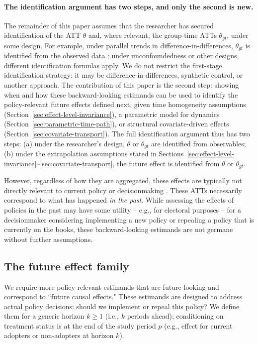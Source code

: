\documentclass{article}
\begin{document}
\paragraph{The identification argument has two steps, and only the second is new.} The remainder of this paper assumes that the researcher has secured identification of the ATT $\theta$ and, where relevant, the group-time ATTs $\theta_{gt}$, under some design. For example, under parallel trends in difference-in-differences, $\theta_{gt}$ is identified from the observed data \citep{callawayDifferenceindifferencesMultipleTime2021,sunEstimatingDynamicTreatment2021}; under unconfoundedness or other designs, different identification formulas apply. We do not restrict the first-stage identification strategy: it may be difference-in-differences, synthetic control, or another approach. The contribution of this paper is the second step: showing when and how these backward-looking estimands can be used to identify the policy-relevant future effects defined next, given time homogeneity assumptions (Section~\ref{sec:effect-level-invariance}), a parametric model for dynamics (Section~\ref{sec:parametric-time-path}), or structural covariate-driven effects (Section~\ref{sec:covariate-transport}). The full identification argument thus has two steps: (a) under the researcher's design, $\theta$ or $\theta_{gt}$ are identified from observables; (b) under the extrapolation assumptions stated in Sections~\ref{sec:effect-level-invariance}--\ref{sec:covariate-transport}, the future effect is identified from $\theta$ or $\theta_{gt}$.

However, regardless of how they are aggregated, these effects are typically not directly relevant to current policy or decisionmaking \citep{egamiElementsExternalValidity2023,khosrowiExtrapolationCausalEffects2019}. These ATTs necessarily correspond to what has happened \textit{in the past}. While assessing the effects of policies in the past may have some utility -- e.g., for electoral purposes -- for a decisionmaker considering implementing a new policy or repealing a policy that is currently on the books, these backward-looking estimands are not germane without further assumptions.

\subsection{The future effect family}\label{sec:effect-family}

We require more policy-relevant estimands that are future-looking and correspond to ``future causal effects." These estimands are designed to address actual policy decisions: should we implement or repeal this policy? We define them for a generic horizon $k \geq 1$ (i.e., $k$ periods ahead); conditioning on treatment status is at the end of the study period $p$ (e.g., effect for current adopters or non-adopters at horizon $k$).
\end{document}
